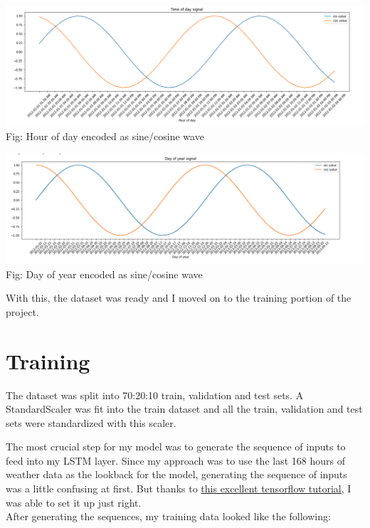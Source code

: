 \documentclass[paper=a4, fontsize=11pt, margin=1in]{scrartcl}
\numberwithin{equation}{section}		%
\numberwithin{figure}{section}			%
\numberwithin{table}{section}				%
\begin{document}
\begin{center}
\includegraphics[scale=0.4]{time-of-day.png}
\\
Fig: Hour of day encoded as sine/cosine wave
\end{center}

\begin{center}
\includegraphics[scale=0.4]{day-of-year.png}
\\
Fig: Day of year encoded as sine/cosine wave
\end{center}

With this, the dataset was ready and I moved on to the training portion of the project.

\pagebreak
\section{\textbf{Training}}

The dataset was split into 70:20:10 train, validation and test sets. 
A StandardScaler was fit into the train dataset and all the train, validation and test sets were standardized with this scaler.

The most crucial step for my model was to generate the sequence of inputs to feed into my LSTM layer. 
Since my approach was to use the last 168 hours of weather data as the lookback for the model, generating the sequence of inputs was a little confusing at first. But thanks to \href{https://www.tensorflow.org/tutorials/structured_data/time_series#data_windowing}{this excellent 
 tensorflow tutorial}, I was able to set it up just right.\\

After generating the sequences, my training data looked like the following:
\end{document}
